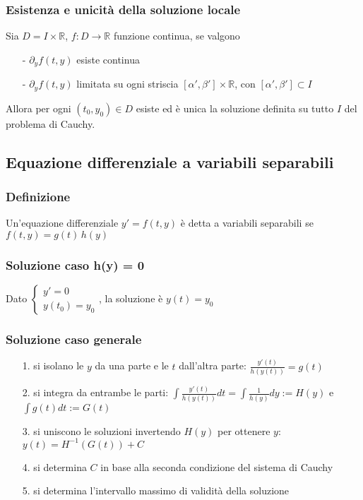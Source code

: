 \documentclass[a4paper]{article}
\newcommand\R{\mathbb{R}}     %
\begin{document}
\subsubsection*{Esistenza e unicità della soluzione locale}
Sia \(D = I \times \R\), \(f: D \to \R\) funzione continua, se valgono
\begin{itemize}[topsep=3pt, itemsep=0pt]
	\item[-] \(\partial_y f(t,y)\) esiste continua
	\item[-] \(\partial_y f(t,y)\) limitata su ogni striscia \([\alpha', \beta'] \times \R\), con \([\alpha', \beta'] \subset I\)
\end{itemize}
Allora per ogni \((t_0,y_0) \in D\) esiste ed è unica la soluzione definita su tutto \(I\) del problema di Cauchy.

\subsection{Equazione differenziale a variabili separabili}
\subsubsection*{Definizione}
Un'equazione differenziale \(y' = f(t,y)\) è detta a variabili separabili se \(f(t,y) = g(t) \, h(y)\)

\subsubsection*{Soluzione caso h(y) = 0}
Dato \(\begin{cases} y' = 0 \\ y(t_0) = y_0 \end{cases}\), la soluzione è \(y(t) = y_0\)

\subsubsection*{Soluzione caso generale}
\begin{itemize}[topsep=3pt, itemsep=0pt]
	\item[1.] si isolano le \(y\) da una parte e le \(t\) dall'altra parte: \(\frac{y'(t)}{h(y(t))} = g(t)\)
	\item[2.] si integra da entrambe le parti: \(\int \frac{y'(t)}{h(y(t))} dt = \int \frac{1}{h(y)} dy := H(y)\) e \(\int g(t) dt := G(t)\)
	\item[3.] si uniscono le soluzioni invertendo \(H(y)\) per ottenere \(y\): \(y(t) = H^{-1}(G(t)) + C\)
	\item[4.] si determina \(C\) in base alla seconda condizione del sistema di Cauchy
	\item[5.] si determina l'intervallo massimo di validità della soluzione
\end{itemize}
\end{document}
